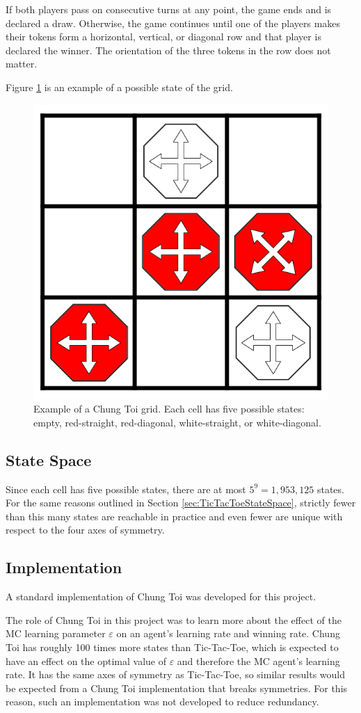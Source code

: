 \documentclass[11pt,a4paper]{report}
\begin{document}
If both players pass on consecutive turns at any point, the game ends and is declared a draw. Otherwise, the game continues until one of the players makes their tokens form a horizontal, vertical, or diagonal row and that player is declared the winner. The orientation of the three tokens in the row does not matter.

Figure \ref{chung-toi-grid-example} is an example of a possible state of the grid.

\begin{figure}[htbp]
	\begin{center}
		\includegraphics[width=0.3\linewidth]{chung_toi_grid_example.png}
		\caption{Example of a Chung Toi grid. Each cell has five possible states: empty, red-straight, red-diagonal, white-straight, or white-diagonal.}
		\label{chung-toi-grid-example}
	\end{center}
\end{figure}


\subsection{State Space}

Since each cell has five possible states, there are at most $5^9 = 1,953,125$ states. For the same reasons outlined in Section \ref{sec:TicTacToeStateSpace}, strictly fewer than this many states are reachable in practice and even fewer are unique with respect to the four axes of symmetry.


\subsection{Implementation}

A standard implementation of Chung Toi was developed for this project.

The role of Chung Toi in this project was to learn more about the effect of the MC learning parameter $\varepsilon$ on an agent's learning rate and winning rate. Chung Toi has roughly 100 times more states than Tic-Tac-Toe, which is expected to have an effect on the optimal value of $\varepsilon$ and therefore the MC agent's learning rate. It has the same axes of symmetry as Tic-Tac-Toe, so similar results would be expected from a Chung Toi implementation that breaks symmetries. For this reason, such an implementation was not developed to reduce redundancy.
\end{document}
